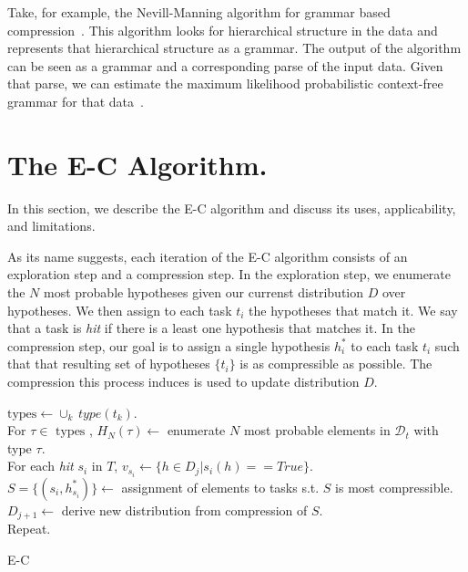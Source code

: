 \documentclass{article}
\begin{document}
Take, for example, the Nevill-Manning algorithm for grammar based
compression~\cite{nevill1997identifying}. This algorithm looks for
hierarchical structure in the data and represents that hierarchical
structure as a grammar. The output of the algorithm can be seen as a
grammar and a corresponding parse of the input data. Given that parse,
we can estimate the maximum likelihood probabilistic context-free
grammar for that data~\cite{johnson1998pcfg}. 

\section{The E-C Algorithm.}

In this section, we describe the E-C algorithm and discuss its uses,
applicability, and limitations.

As its name suggests, each iteration of the E-C algorithm consists of
an exploration step and a compression step. In the exploration step,
we enumerate the $N$ most probable hypotheses given our currenst
distribution $D$ over hypotheses. We then assign to each task $t_i$
the hypotheses that match it. We say that a task is \emph{hit} if
there is a least one hypothesis that matches it. In the compression
step, our goal is to assign a single hypothesis $h_i^*$ to each task
$t_i$ such that that resulting set of hypotheses $\{t_i\}$ is as
compressible as possible. The compression this process induces is used
to update distribution $D$.

  \begin{algorithm}
    \SetAlgoLined {}  

    $\text{types} \leftarrow \cup_k \, type(t_k)$. \\
    For $\tau \in \text{ types}$ , $H_N(\tau) \leftarrow$ enumerate
    $N$ most probable elements in $\mathcal{D}_t$ with type $\tau$.\\

    For each \emph{hit} $s_i$ in 
    $T$, $v_{s_i} \leftarrow \{h \in D_j | s_i(h) == True \}$.\\

    $S = \{(s_i, h^*_{s_i})\} \leftarrow$ assignment of elements to tasks s.t. 
    $S$ is most compressible. \\

    $D_{j+1} \leftarrow$ derive new distribution from compression of $S$. \\

    Repeat. 

    \caption{E-C}
  \end{algorithm}
\end{document}
